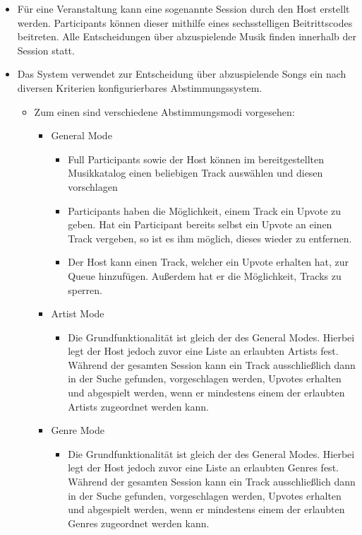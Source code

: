 \documentclass[oneside, ngerman]{sdqtechreport}
\begin{document}
\begin{itemize}
\begin{itemize}
        \end{itemize}
    \item Für eine Veranstaltung kann eine sogenannte Session durch den Host erstellt werden. Participants können dieser mithilfe eines sechsstelligen Beitrittscodes beitreten. Alle Entscheidungen über abzuspielende Musik finden innerhalb der Session statt.
    \item Das System verwendet zur Entscheidung über abzuspielende Songs ein nach diversen Kriterien konfigurierbares Abstimmungssystem.
    \begin{itemize}
        \item Zum einen sind verschiedene Abstimmungsmodi vorgesehen:
        \begin{itemize}
            \item General Mode
            \begin{itemize}
                \item Full Participants sowie der Host können im bereitgestellten Musikkatalog einen beliebigen Track auswählen und diesen vorschlagen
                \item Participants haben die Möglichkeit, einem Track ein Upvote zu geben. Hat ein Participant bereits selbst ein Upvote an einen Track vergeben, so ist es ihm möglich, dieses wieder zu entfernen.
                \item Der Host kann einen Track, welcher ein Upvote erhalten hat, zur Queue hinzufügen. Außerdem hat er die Möglichkeit, Tracks zu sperren.
            \end{itemize}
            \item Artist Mode
            \begin{itemize}
                \item Die Grundfunktionalität ist gleich der des General Modes. Hierbei legt der Host jedoch zuvor eine Liste an erlaubten Artists fest. Während der gesamten Session kann ein Track ausschließlich dann in der Suche gefunden, vorgeschlagen werden, Upvotes erhalten und abgespielt werden, wenn er mindestens einem der erlaubten Artists zugeordnet werden kann.
            \end{itemize}
            \item Genre Mode
            \begin{itemize}
                \item Die Grundfunktionalität ist gleich der des General Modes. Hierbei legt der Host jedoch zuvor eine Liste an erlaubten Genres fest. Während der gesamten Session kann ein Track ausschließlich dann in der Suche gefunden, vorgeschlagen werden, Upvotes erhalten und abgespielt werden, wenn er mindestens einem der erlaubten Genres zugeordnet werden kann.

\end{itemize}
\end{itemize}
\end{itemize}
\end{itemize}
\end{document}
